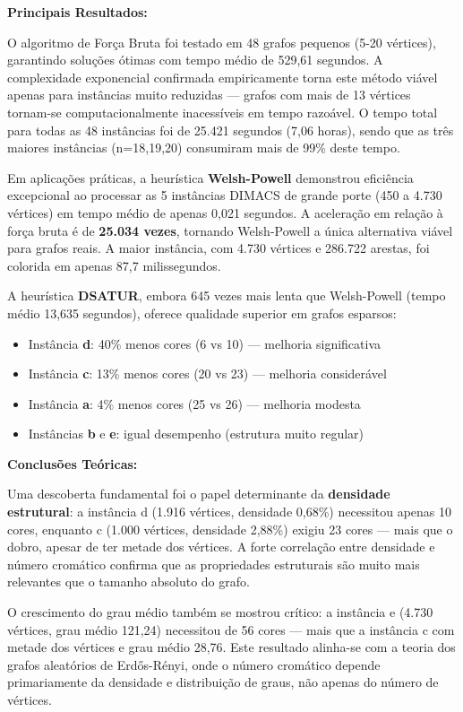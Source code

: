 \documentclass[12pt]{article}
\begin{document}
\textbf{Principais Resultados:}

O algoritmo de Força Bruta foi testado em 48 grafos pequenos (5-20 vértices), garantindo soluções ótimas com tempo médio de 529,61 segundos. A complexidade exponencial confirmada empiricamente torna este método viável apenas para instâncias muito reduzidas — grafos com mais de 13 vértices tornam-se computacionalmente inacessíveis em tempo razoável. O tempo total para todas as 48 instâncias foi de 25.421 segundos (7,06 horas), sendo que as três maiores instâncias (n=18,19,20) consumiram mais de 99\% deste tempo.

Em aplicações práticas, a heurística \textbf{Welsh-Powell} demonstrou eficiência excepcional ao processar as 5 instâncias DIMACS de grande porte (450 a 4.730 vértices) em tempo médio de apenas 0,021 segundos. A aceleração em relação à força bruta é de \textbf{25.034 vezes}, tornando Welsh-Powell a única alternativa viável para grafos reais. A maior instância, com 4.730 vértices e 286.722 arestas, foi colorida em apenas 87,7 milissegundos.

A heurística \textbf{DSATUR}, embora 645 vezes mais lenta que Welsh-Powell (tempo médio 13,635 segundos), oferece qualidade superior em grafos esparsos:

\begin{itemize}
    \item Instância \textbf{d}: 40\% menos cores (6 vs 10) — melhoria significativa
    \item Instância \textbf{c}: 13\% menos cores (20 vs 23) — melhoria considerável
    \item Instância \textbf{a}: 4\% menos cores (25 vs 26) — melhoria modesta
    \item Instâncias \textbf{b} e \textbf{e}: igual desempenho (estrutura muito regular)
\end{itemize}

\textbf{Conclusões Teóricas:}

Uma descoberta fundamental foi o papel determinante da \textbf{densidade estrutural}: a instância d (1.916 vértices, densidade 0,68\%) necessitou apenas 10 cores, enquanto c (1.000 vértices, densidade 2,88\%) exigiu 23 cores — mais que o dobro, apesar de ter metade dos vértices. A forte correlação entre densidade e número cromático confirma que as propriedades estruturais são muito mais relevantes que o tamanho absoluto do grafo.

O crescimento do grau médio também se mostrou crítico: a instância e (4.730 vértices, grau médio 121,24) necessitou de 56 cores — mais que a instância c com metade dos vértices e grau médio 28,76. Este resultado alinha-se com a teoria dos grafos aleatórios de Erdős-Rényi, onde o número cromático depende primariamente da densidade e distribuição de graus, não apenas do número de vértices.
\end{document}
